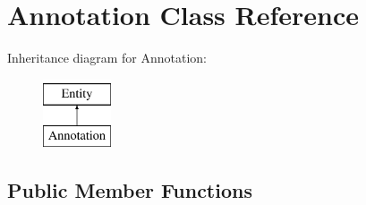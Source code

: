 \hypertarget{classAnnotation}{
\section{Annotation Class Reference}
\label{classAnnotation}
}
Inheritance diagram for Annotation:\begin{figure}[H]
\begin{center}
\leavevmode
\includegraphics[height=2.000000cm]{classAnnotation}
\end{center}
\end{figure}
\subsection*{Public Member Functions}

